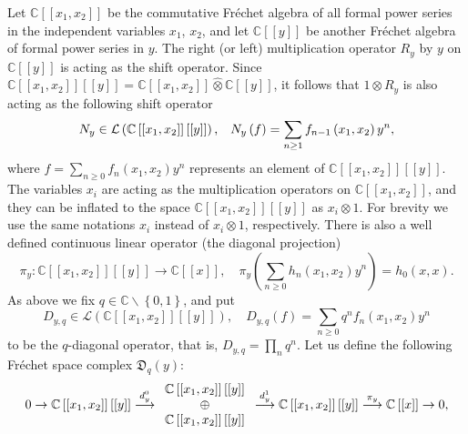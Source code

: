 \documentclass[12pt,reqno]{amsart}%
\theoremstyle{plain}
\numberwithin{theorem}{section} \numberwithin{equation}{section}
\numberwithin{lemma}{section}
\numberwithin{remark}{section}
\numberwithin{example}{section}
\numberwithin{proposition}{section}
\numberwithin{definition}{section}
\numberwithin{corollary}{section}
\begin{document}
Let $\mathbb{C}\left[  \left[  x_{1},x_{2}\right]  \right]  $ be the
commutative Fr\'{e}chet algebra of all formal power series in the independent
variables $x_{1}$, $x_{2}$, and let $\mathbb{C}\left[  \left[  y\right]
\right]  $ be another Fr\'{e}chet algebra of formal power series in $y$. The
right (or left) multiplication operator $R_{y}$ by $y$ on $\mathbb{C}\left[
\left[  y\right]  \right]  $ is acting as the shift operator. Since
$\mathbb{C}\left[  \left[  x_{1},x_{2}\right]  \right]  \left[  \left[
y\right]  \right]  =\mathbb{C}\left[  \left[  x_{1},x_{2}\right]  \right]
\widehat{\otimes}\mathbb{C}\left[  \left[  y\right]  \right]  $, it follows
that $1\otimes R_{y}$ is also acting as the following shift operator
\[
N_{y}\in\mathcal{L}\left(  \mathbb{C}\left[  \left[  x_{1},x_{2}\right]
\right]  \left[  \left[  y\right]  \right]  \right)  \text{,\quad}N_{y}\left(
f\right)  =\sum_{n\geq1}f_{n-1}\left(  x_{1},x_{2}\right)  y^{n},
\]
where $f=\sum_{n\geq0}f_{n}\left(  x_{1},x_{2}\right)  y^{n}$ represents an
element of $\mathbb{C}\left[  \left[  x_{1},x_{2}\right]  \right]  \left[
\left[  y\right]  \right]  $. The variables $x_{i}$ are acting as the
multiplication operators on $\mathbb{C}\left[  \left[  x_{1},x_{2}\right]
\right]  $, and they can be inflated to the space $\mathbb{C}\left[  \left[
x_{1},x_{2}\right]  \right]  \left[  \left[  y\right]  \right]  $ as
$x_{i}\otimes1$. For brevity we use the same notations $x_{i}$ instead of
$x_{i}\otimes1$, respectively. There is also a well defined continuous linear
operator (the diagonal projection)
\[
\pi_{y}:\mathbb{C}\left[  \left[  x_{1},x_{2}\right]  \right]  \left[  \left[
y\right]  \right]  \longrightarrow\mathbb{C}\left[  \left[  x\right]  \right]
,\quad\pi_{y}\left(  \sum_{n\geq0}h_{n}\left(  x_{1},x_{2}\right)
y^{n}\right)  =h_{0}\left(  x,x\right)  .
\]
As above we fix $q\in\mathbb{C}\backslash\left\{  0,1\right\}  $, and put
\[
D_{y,q}\in\mathcal{L}\left(  \mathbb{C}\left[  \left[  x_{1},x_{2}\right]
\right]  \left[  \left[  y\right]  \right]  \right)  ,\quad D_{y,q}\left(
f\right)  =\sum_{n\geq0}q^{n}f_{n}\left(  x_{1},x_{2}\right)  y^{n}%
\]
to be the $q$-diagonal operator, that is, $D_{y,q}=\prod\limits_{n}q^{n}$. Let
us define the following Fr\'{e}chet space complex $\mathfrak{D}_{q}\left(
y\right)  $:
\[
0\rightarrow\mathbb{C}\left[  \left[  x_{1},x_{2}\right]  \right]  \left[
\left[  y\right]  \right]  \overset{d_{y}^{0}}{\longrightarrow}%
\begin{array}
[c]{c}%
\mathbb{C}\left[  \left[  x_{1},x_{2}\right]  \right]  \left[  \left[
y\right]  \right] \\
\oplus\\
\mathbb{C}\left[  \left[  x_{1},x_{2}\right]  \right]  \left[  \left[
y\right]  \right]
\end{array}
\overset{d_{y}^{1}}{\longrightarrow}\mathbb{C}\left[  \left[  x_{1}%
,x_{2}\right]  \right]  \left[  \left[  y\right]  \right]  \overset{\pi
_{y}}{\longrightarrow}\mathbb{C}\left[  \left[  x\right]  \right]
\rightarrow0,
\]
\end{document}

